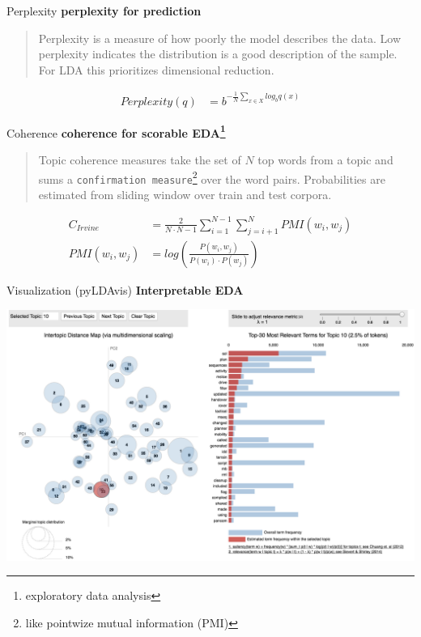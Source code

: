 \documentclass[10pt]{beamer}
\begin{document}
\begin{frame}{Perplexity}
  {\bf perplexity for prediction}

  \begin{quote}
    Perplexity is a measure of how poorly the model describes the data. Low perplexity indicates the distribution is a good description of the sample. For LDA this prioritizes dimensional reduction.
  \end{quote}

  \begin{align*}
    Perplexity(q) &= b^{-\frac{1}{N}\sum_{x \in X} log_b q(x)}
  \end{align*}

\end{frame}
\begin{frame}{Coherence}
  {\bf coherence for scorable EDA\footnote{exploratory data analysis}}
  \begin{quote}
    Topic coherence measures take the set of $N$ top words from a topic and sums a \texttt{confirmation measure}\footnote{like pointwize mutual information (PMI)} over the word pairs. Probabilities are estimated from sliding window over train and test corpora.
  \end{quote}

  \begin{align*}
    C_{Irvine} &= \frac{2}{N\cdot N-1}\sum_{i=1}^{N-1}\sum_{j=i+1}^N PMI(w_i, w_j)\\
    PMI(w_i, w_j) &= log(\frac{P(w_i, w_j)}{P(w_i)\cdot P(w_j)})
  \end{align*}
\end{frame}

\begin{frame}{Visualization (pyLDAvis)}
  {\bf Interpretable EDA}

    \includegraphics[width=\textwidth]{LDAvis.png}

\end{frame}
\end{document}
